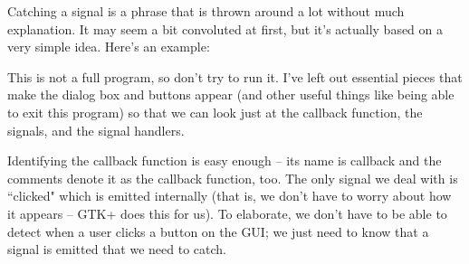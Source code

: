 \documentclass{report}
\begin{document}
\begin{appendices}
Catching a signal is a phrase that is thrown around a lot without much explanation. It may seem a bit convoluted at first, but it's actually based on a very simple idea. Here's an example:



\begin{center}
\end{center}

This is not a full program, so don't try to run it. I've left out essential pieces that make the dialog box and buttons appear (and other useful things like being able to exit this program) so that we can look just at the callback function, the signals, and the signal handlers. 

Identifying the callback function is easy enough -- its name is callback and the comments denote it as the callback function, too. The only signal we deal with is ``clicked" which is emitted internally (that is, we don't have to worry about how it appears -- GTK+ does this for us). To elaborate, we don't have to be able to detect when a user clicks a button on the GUI; we just need to know that a signal is emitted that we need to catch.


\end{appendices}
\end{document}
